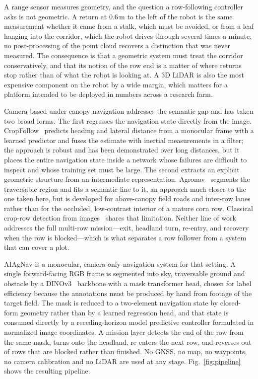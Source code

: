 \documentclass[conference]{IEEEtran}
\begin{document}
A range sensor measures geometry, and the question a row-following controller
asks is not geometric. A return at 0.6\,m to the left of the robot is the same
measurement whether it came from a stalk, which must be avoided, or from a leaf
hanging into the corridor, which the robot drives through several times a
minute; no post-processing of the point cloud recovers a distinction that was
never measured. The consequence is that a geometric system must treat the
corridor conservatively, and that its notion of the row end is a matter of where
returns stop rather than of what the robot is looking at. A 3D LiDAR is also the
most expensive component on the robot by a wide margin, which matters for a
platform intended to be deployed in numbers across a research farm.

Camera-based under-canopy navigation addresses the semantic gap and has taken
two broad forms. The first regresses the navigation state directly from the
image. CropFollow~\cite{sivakumar2021cropfollow} predicts heading and lateral
distance from a monocular frame with a learned predictor and fuses the estimate
with inertial measurements in a filter; the approach is robust and has been
demonstrated over long distances, but it places the entire navigation state
inside a network whose failures are difficult to inspect and whose training set
must be large. The second extracts an explicit geometric structure from an
intermediate representation. Agronav~\cite{panda2023agronav} segments the
traversable region and fits a semantic line to it, an approach much closer to
the one taken here, but is developed for above-canopy field roads and inter-row
lanes rather than for the occluded, low-contrast interior of a mature corn row.
Classical crop-row detection from images~\cite{ref13} shares that limitation.
Neither line of work addresses the full multi-row mission---exit, headland turn,
re-entry, and recovery when the row is blocked---which is what separates a row
follower from a system that can cover a plot.

AIAgNav is a monocular, camera-only navigation system for that setting. A single
forward-facing RGB frame is segmented into sky, traversable ground and obstacle
by a DINOv3~\cite{simeoni2025dinov3} backbone with a mask transformer head,
chosen for label efficiency because the annotations must be produced by hand
from footage of the target field. The mask is reduced to a two-element
navigation state by closed-form geometry rather than by a learned regression
head, and that state is consumed directly by a receding-horizon model predictive
controller formulated in normalized image coordinates. A mission layer detects
the end of the row from the same mask, turns onto the headland, re-enters the
next row, and reverses out of rows that are blocked rather than finished. No
GNSS, no map, no waypoints, no camera calibration and no LiDAR are used at any
stage. Fig.~\ref{fig:pipeline} shows the resulting pipeline.
\end{document}
